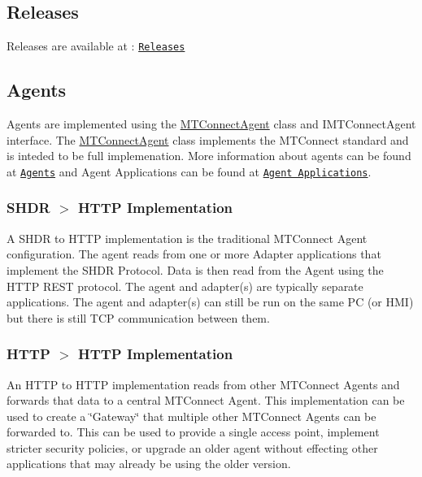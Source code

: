 \subsection*{Releases}

Releases are available at \+: \href{https://github.com/TrakHound/MTConnect.NET/releases}{\tt Releases}

\subsection*{Agents}

Agents are implemented using the \mbox{\hyperlink{namespace_m_t_connect_agent}{M\+T\+Connect\+Agent}} class and I\+M\+T\+Connect\+Agent interface. The \mbox{\hyperlink{namespace_m_t_connect_agent}{M\+T\+Connect\+Agent}} class implements the M\+T\+Connect standard and is inteded to be full implemenation. More information about agents can be found at \href{https://github.com/TrakHound/MTConnect.NET/tree/master/src/MTConnect.NET-Common/Agents}{\tt Agents} and Agent Applications can be found at \href{https://github.com/TrakHound/MTConnect.NET/tree/master/applications/Agents}{\tt Agent Applications}.

\subsubsection*{S\+H\+DR $>$ H\+T\+TP Implementation}

A S\+H\+DR to H\+T\+TP implementation is the traditional M\+T\+Connect Agent configuration. The agent reads from one or more Adapter applications that implement the S\+H\+DR Protocol. Data is then read from the Agent using the H\+T\+TP R\+E\+ST protocol. The agent and adapter(s) are typically separate applications. The agent and adapter(s) can still be run on the same PC (or H\+MI) but there is still T\+CP communication between them.



\subsubsection*{H\+T\+TP $>$ H\+T\+TP Implementation}

An H\+T\+TP to H\+T\+TP implementation reads from other M\+T\+Connect Agents and forwards that data to a central M\+T\+Connect Agent. This implementation can be used to create a \char`\"{}\+Gateway\char`\"{} that multiple other M\+T\+Connect Agents can be forwarded to. This can be used to provide a single access point, implement stricter security policies, or upgrade an older agent without effecting other applications that may already be using the older version.



